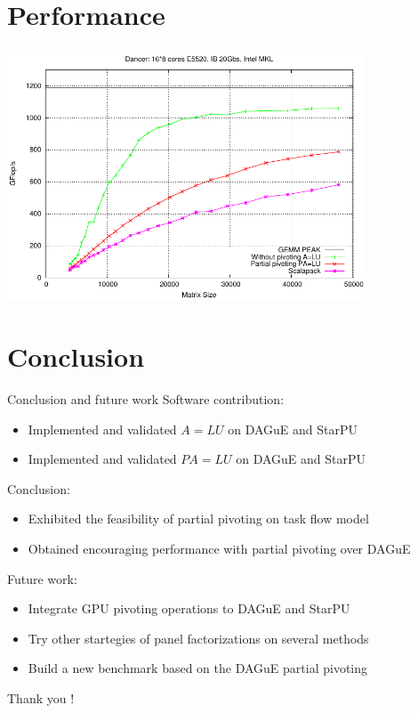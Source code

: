 \documentclass{beamer}
\begin{document}


\section{Performance}
\begin{frame}
\begin{center}
\includegraphics[width=0.8\textwidth]{gepp}
\end{center}
\end{frame}

\section*{Conclusion}
\begin{frame}{Conclusion and future work}
Software contribution:
\begin{itemize}
\item Implemented and validated $A=LU$ on DAGuE and StarPU
\item Implemented and validated $PA=LU$ on DAGuE and StarPU
\end{itemize}
Conclusion:
\begin{itemize}
\item Exhibited the feasibility of partial pivoting on task flow model
\item Obtained encouraging performance with partial pivoting over DAGuE
\end{itemize}
Future work:
\begin{itemize}
\item Integrate GPU pivoting operations to DAGuE and StarPU
\item Try other startegies of panel factorizations on several methods
\item Build a new benchmark based on the DAGuE partial pivoting
\end{itemize}
\end{frame}

\begin{frame}
\begin{center}
\huge{Thank you !}
\end{center}
\end{frame}


\end{document}
